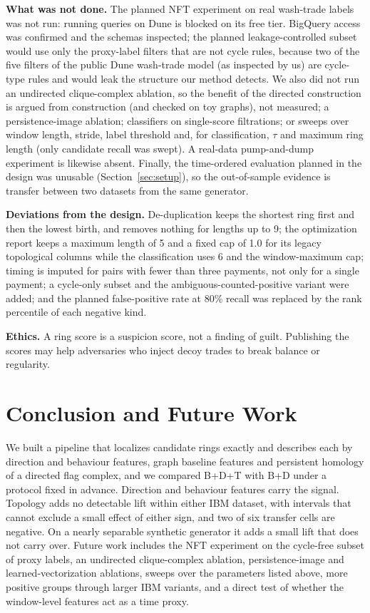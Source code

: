 \documentclass[conference]{IEEEtran}
\begin{document}
\textbf{What was not done.} The planned NFT experiment on real wash-trade labels was not run: running queries on Dune is blocked on its free tier. BigQuery access was confirmed and the schemas inspected; the planned leakage-controlled subset would use only the proxy-label filters that are not cycle rules, because two of the five filters of the public Dune wash-trade model (as inspected by us) are cycle-type rules and would leak the structure our method detects. We also did not run an undirected clique-complex ablation, so the benefit of the directed construction is argued from construction (and checked on toy graphs), not measured; a persistence-image ablation; classifiers on single-score filtrations; or sweeps over window length, stride, label threshold and, for classification, $\tau$ and maximum ring length (only candidate recall was swept). A real-data pump-and-dump experiment is likewise absent. Finally, the time-ordered evaluation planned in the design was unusable (Section~\ref{sec:setup}), so the out-of-sample evidence is transfer between two datasets from the same generator.

\textbf{Deviations from the design.} De-duplication keeps the shortest ring first and then the lowest birth, and removes nothing for lengths up to 9; the optimization report keeps a maximum length of 5 and a fixed cap of 1.0 for its legacy topological columns while the classification uses 6 and the window-maximum cap; timing is imputed for pairs with fewer than three payments, not only for a single payment; a cycle-only subset and the ambiguous-counted-positive variant were added; and the planned false-positive rate at 80\% recall was replaced by the rank percentile of each negative kind.

\textbf{Ethics.} A ring score is a suspicion score, not a finding of guilt. Publishing the scores may help adversaries who inject decoy trades to break balance or regularity.

\section{Conclusion and Future Work}
\label{sec:conclusion}

We built a pipeline that localizes candidate rings exactly and describes each by direction and behaviour features, graph baseline features and persistent homology of a directed flag complex, and we compared B+D+T with B+D under a protocol fixed in advance. Direction and behaviour features carry the signal. Topology adds no detectable lift within either IBM dataset, with intervals that cannot exclude a small effect of either sign, and two of six transfer cells are negative. On a nearly separable synthetic generator it adds a small lift that does not carry over. Future work includes the NFT experiment on the cycle-free subset of proxy labels, an undirected clique-complex ablation, persistence-image and learned-vectorization ablations, sweeps over the parameters listed above, more positive groups through larger IBM variants, and a direct test of whether the window-level features act as a time proxy.
\end{document}
